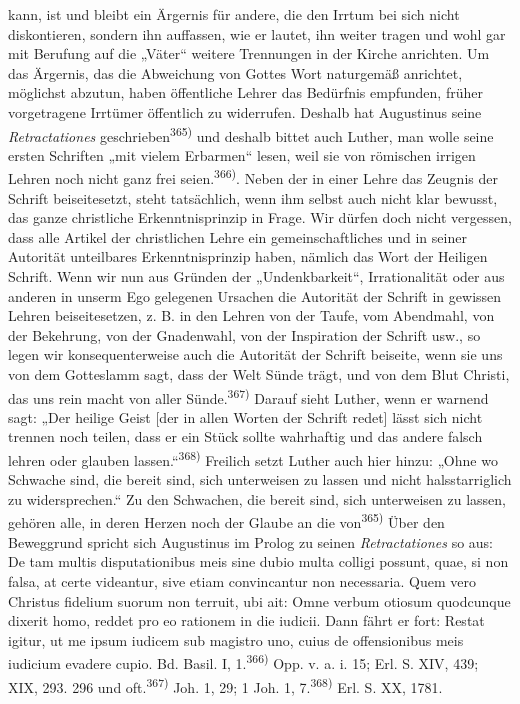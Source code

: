 kann, ist und bleibt ein Ärgernis für andere, die den Irrtum bei sich nicht diskontieren, sondern ihn auffassen, wie er lautet, ihn weiter tragen und wohl gar mit Berufung auf die „Väter“ weitere Trennungen in der Kirche anrichten. Um das Ärgernis, das die Abweichung von Gottes Wort naturgemäß anrichtet, möglichst abzutun, haben öffentliche Lehrer das Bedürfnis empfunden, früher vorgetragene Irrtümer öffentlich zu widerrufen. Deshalb hat Augustinus seine \textit{Retractationes} geschrieben\textsuperscript{365)} und deshalb bittet auch Luther, man wolle seine ersten Schriften „mit vielem Erbarmen“ lesen, weil sie von römischen irrigen Lehren noch nicht ganz frei seien.\textsuperscript{366)}\newline{}. Neben der in einer Lehre das Zeugnis der Schrift beiseitesetzt, steht tatsächlich, wenn ihm selbst auch nicht klar bewusst, das ganze christliche Erkenntnisprinzip in Frage. Wir dürfen doch nicht vergessen, dass alle Artikel der christlichen Lehre ein gemeinschaftliches und in seiner Autorität unteilbares Erkenntnisprinzip haben, nämlich das Wort der Heiligen Schrift. Wenn wir nun aus Gründen der „Undenkbarkeit“, Irrationalität oder aus anderen in unserm Ego gelegenen Ursachen die Autorität der Schrift in gewissen Lehren beiseitesetzen, z. B. in den Lehren von der Taufe, vom Abendmahl, von der Bekehrung, von der Gnadenwahl, von der Inspiration der Schrift usw., so legen wir konsequenterweise auch die Autorität der Schrift beiseite, wenn sie uns von dem Gotteslamm sagt, dass der Welt Sünde trägt, und von dem Blut Christi, das uns rein macht von aller Sünde.\textsuperscript{367)} Darauf sieht Luther, wenn er warnend sagt: „Der heilige Geist [der in allen Worten der Schrift redet] lässt sich nicht trennen noch teilen, dass er ein Stück sollte wahrhaftig und das andere falsch lehren oder glauben lassen.“\textsuperscript{368)} Freilich setzt Luther auch hier hinzu: „Ohne wo Schwache sind, die bereit sind, sich unterweisen zu lassen und nicht halsstarriglich zu widersprechen.“ Zu den Schwachen, die bereit sind, sich unterweisen zu lassen, gehören alle, in deren Herzen noch der Glaube an die von\newline\newline \textsuperscript{365)} Über den Beweggrund spricht sich Augustinus im Prolog zu seinen \textit{Retractationes} so aus: De tam multis disputationibus meis sine dubio multa colligi possunt, quae, si non falsa, at certe videantur, sive etiam convincantur non necessaria. Quem vero Christus fidelium suorum non terruit, ubi ait: Omne verbum otiosum quodcunque dixerit homo, reddet pro eo rationem in die iudicii. Dann fährt er fort: Restat igitur, ut me ipsum iudicem sub magistro uno, cuius de offensionibus meis iudicium evadere cupio. Bd. Basil. I, 1.\newline \textsuperscript{366)} Opp. v. a. i. 15; Erl. S. XIV, 439; XIX, 293. 296 und oft.\newline \textsuperscript{367)} Joh. 1, 29; 1 Joh. 1, 7.\newline \textsuperscript{368)} Erl. S. XX, 1781.